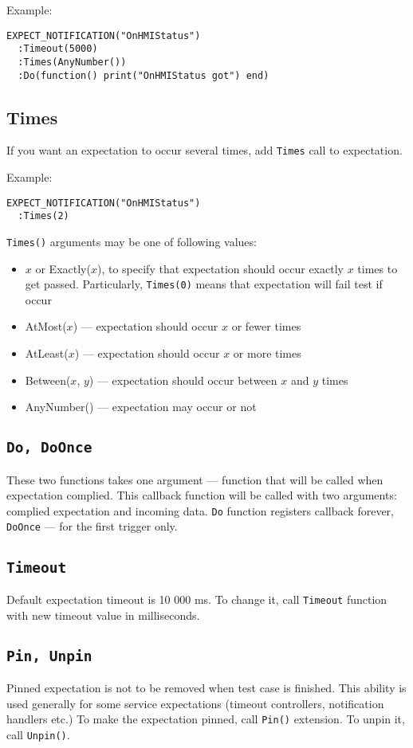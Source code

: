 \documentclass{article}
\begin{document}
\noindent Example:
\begin{lstlisting}
EXPECT_NOTIFICATION("OnHMIStatus")
  :Timeout(5000)
  :Times(AnyNumber())
  :Do(function() print("OnHMIStatus got") end)
\end{lstlisting}
\subsection{Times}
If you want an expectation to occur several times, add {\tt Times} call
to expectation.

\noindent Example:
\begin{lstlisting}
EXPECT_NOTIFICATION("OnHMIStatus")
  :Times(2)
\end{lstlisting}
{\tt Times()} arguments may be one of following values:
\begin{itemize}
\item $x$ or Exactly($x$), to specify that expectation should occur exactly $x$
times to get passed.
Particularly, {\tt Times(0)} means that expectation will fail test if occur
\item AtMost($x$) --- expectation should occur $x$ or fewer times
\item AtLeast($x$) --- expectation should occur $x$ or more times
\item Between($x$, $y$) --- expectation should occur between $x$ and $y$ times
\item AnyNumber() --- expectation may occur or not
\end{itemize}
\subsection{\tt Do, DoOnce}
These two functions takes one argument --- function that will be called when
expectation complied.
This callback function will be called with two arguments: complied expectation
and incoming data.
{\tt Do} function registers callback forever, {\tt DoOnce} --- for the first
trigger only.
\subsection{\tt Timeout}
Default expectation timeout is 10 000 ms.
To change it, call {\tt Timeout} function with new timeout value in milliseconds.
\subsection{\tt Pin, Unpin}
Pinned expectation is not to be removed when test case is finished.
This ability is used generally for some service expectations (timeout controllers,
notification handlers etc.)
To make the expectation pinned, call {\tt Pin()} extension.
To unpin it, call {\tt Unpin()}.
\end{document}
